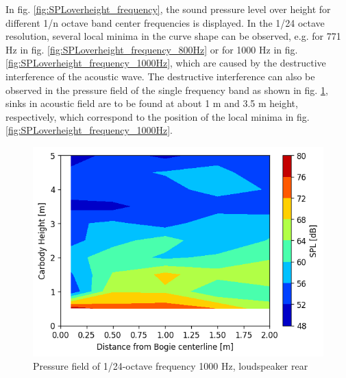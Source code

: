 In fig. \ref{fig:SPLoverheight_frequency}, the sound pressure level over height for different 1/n octave band center frequencies is displayed. In the 1/24 octave resolution, several local minima in the curve shape can be observed, e.g. for 771 Hz in fig. \ref{fig:SPLoverheight_frequency_800Hz} or for 1000 Hz in fig. \ref{fig:SPLoverheight_frequency_1000Hz}, which are caused by the destructive interference of the acoustic wave. The destructive interference can also be observed in the pressure field of the single frequency band as shown in fig. \ref{fig:pressurefield_1000Hz}, sinks in acoustic field are to be found at about 1 m and 3.5 m height, respectively, which correspond to the position of the local minima in fig. \ref{fig:SPLoverheight_frequency_1000Hz}.


\begin{figure}[H]
    \centering
    \includegraphics[width=0.6\linewidth]{fig/pressure_field_1000Hz.png}
    \caption{Pressure field of 1/24-octave frequency 1000 Hz, loudspeaker rear}
    \label{fig:pressurefield_1000Hz}
\end{figure}
